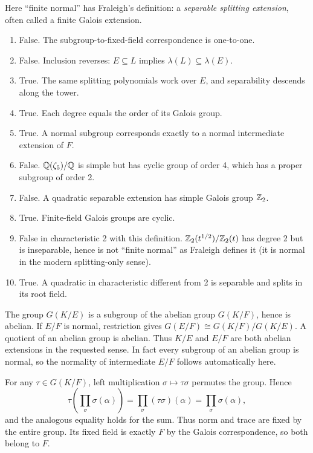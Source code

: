 Here ``finite normal'' has Fraleigh's definition: a \emph{separable splitting extension}, often called a finite Galois extension.
\begin{enumerate}[label=(\alph*)]
\item False. The subgroup-to-fixed-field correspondence is one-to-one.
\item False. Inclusion reverses: $E\subseteq L$ implies $\lambda(L)\subseteq\lambda(E)$.
\item True. The same splitting polynomials work over $E$, and separability descends along the tower.
\item True. Each degree equals the order of its Galois group.
\item True. A normal subgroup corresponds exactly to a normal intermediate extension of $F$.
\item False. $\mathbb{Q}(\zeta_5)/\mathbb{Q}$ is simple but has cyclic group of order 4, which has a proper subgroup of order 2.
\item False. A quadratic separable extension has simple Galois group $\mathbb{Z}_2$.
\item True. Finite-field Galois groups are cyclic.
\item False in characteristic 2 with this definition. $\mathbb{Z}_2(t^{1/2})/\mathbb{Z}_2(t)$ has degree 2 but is inseparable, hence is not ``finite normal'' as Fraleigh defines it (it is normal in the modern splitting-only sense).
\item True. A quadratic in characteristic different from 2 is separable and splits in its root field.
\end{enumerate}

The group $G(K/E)$ is a subgroup of the abelian group $G(K/F)$, hence is abelian. If $E/F$ is normal, restriction gives $G(E/F)\cong G(K/F)/G(K/E)$. A quotient of an abelian group is abelian. Thus $K/E$ and $E/F$ are both abelian extensions in the requested sense. In fact every subgroup of an abelian group is normal, so the normality of intermediate $E/F$ follows automatically here.

For any $\tau\in G(K/F)$, left multiplication $\sigma\mapsto\tau\sigma$ permutes the group. Hence
\[\tau\left(\prod_\sigma\sigma(\alpha)\right)=\prod_\sigma(\tau\sigma)(\alpha)=\prod_\sigma\sigma(\alpha),\]
and the analogous equality holds for the sum. Thus norm and trace are fixed by the entire group. Its fixed field is exactly $F$ by the Galois correspondence, so both belong to $F$.

